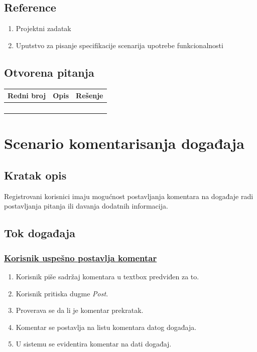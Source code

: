 \documentclass[11pt,a4paper]{article}
\begin{document}
\subsection{Reference}
\begin{enumerate}
    \item Projektni zadatak
    \item Uputstvo za pisanje specifikacije scenarija upotrebe funkcionalnosti
\end{enumerate}
\subsection{Otvorena pitanja}
\begin{center}
\begin{tabular}{| >{\centering\arraybackslash}m{1.9cm} | >{\centering\arraybackslash}m{4.9cm} | >{\centering\arraybackslash}m{4.9cm} |}
\hline
\rowcolor[HTML]{000000} 
{\color[HTML]{FFFFFF} Redni broj } & {\color[HTML]{FFFFFF} Opis } & {\color[HTML]{FFFFFF} Rešenje } \\ \hline
 &  & \\ \hline
 &  &  \\ \hline
 &  &  \\ \hline
 &  &  \\ \hline
\end{tabular}
\end{center}

\newpage

\section{Scenario komentarisanja događaja}
\subsection{Kratak opis}
Registrovani korisnici imaju mogućnost postavljanja komentara na događaje radi postavljanja pitanja ili davanja dodatnih informacija.
\subsection{Tok događaja}
\subsubsection{\underline{Korisnik uspešno postavlja komentar}}
\begin{enumerate}
    \item Korisnik piše sadržaj komentara u textbox predviđen za to.
    \item Korisnik pritiska dugme \textit{Post}.
    \item Proverava se da li je komentar prekratak.
    \item Komentar se postavlja na listu komentara datog događaja.
    \item U sistemu se evidentira komentar na dati događaj.
\end{enumerate}
\end{document}

